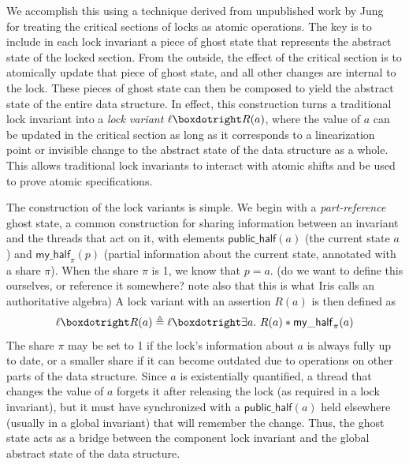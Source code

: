 \documentclass[acmsmall,screen]{acmart}\settopmatter{printfolios=true}
\newcommand{\islock}{\boxdotright}
\newcommand{\myhalf}[2]{\ensuremath{\mathsf{my\_half}_{#1}(#2)}}
\newcommand{\publichalf}[1]{\ensuremath{\mathsf{public\_half}(#1)}}
\begin{document}
We accomplish this using a technique derived from unpublished work by Jung~\cite{ralf-convo} for treating the critical sections of locks as atomic operations. The key is to include in each lock invariant a piece of ghost state that represents the abstract state of the locked section. From the outside, the effect of the critical section is to atomically update that piece of ghost state, and all other changes are internal to the lock. These pieces of ghost state can then be composed to yield the abstract state of the entire data structure. In effect, this construction turns a traditional lock invariant into a \emph{lock variant} $\ell \islock R(a)$, where the value of $a$ can be updated in the critical section as long as it corresponds to a linearization point or invisible change to the abstract state of the data structure as a whole. This allows traditional lock invariants to interact with atomic shifts and be used to prove atomic specifications.

The construction of the lock variants is simple. We begin with a \emph{part-reference} ghost state, a common construction for sharing information between an invariant and the threads that act on it, with elements $\publichalf{a}$ (the current state $a$) and $\myhalf{\pi}{p}$ (partial information about the current state, annotated with a share $\pi$). When the share $\pi$ is 1, we know that $p = a$. (do we want to define this ourselves, or reference it somewhere? note also that this is what Iris calls an authoritative algebra) A lock variant with an assertion $R(a)$ is then defined as %
$$\ell \islock R(a) \triangleq \ell \islock \exists a.\ R(a) * \myhalf{\pi}{a}$$ %
The share $\pi$ may be set to 1 if the lock's information about $a$ is always fully up to date, or a smaller share if it can become outdated due to operations on other parts of the data structure. Since $a$ is existentially quantified, a thread that changes the value of $a$ forgets it after releasing the lock (as required in a lock invariant), but it must have synchronized with a $\publichalf{a}$ held elsewhere (usually in a global invariant) that will remember the change. Thus, the ghost state acts as a bridge between the component lock invariant and the global abstract state of the data structure. %
\end{document}
